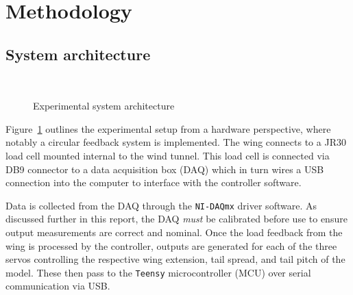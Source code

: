 \section{Methodology}
    \subsection{System architecture}

	\begin{figure}[h]
	    \centering
        \caption{Experimental system architecture}\label{fig:architecture_hardware}
	\end{figure}

	Figure~\ref{fig:architecture_hardware} outlines the experimental setup from a hardware perspective, where notably a circular feedback system is implemented. The wing connects to a JR30 load cell mounted internal to the wind tunnel. This load cell is connected via DB9 connector to a data acquisition box (DAQ) which in turn wires a USB connection into the computer to interface with the controller software.

	Data is collected from the DAQ through the \verb|NI-DAQmx| driver software. As discussed further in this report, the DAQ \textit{must} be calibrated before use to ensure output measurements are correct and nominal. Once the load feedback from the wing is processed by the controller, outputs are generated for each of the three servos controlling the respective wing extension, tail spread, and tail pitch of the model. These then pass to the \verb|Teensy| microcontroller (MCU) over serial communication via USB. 

